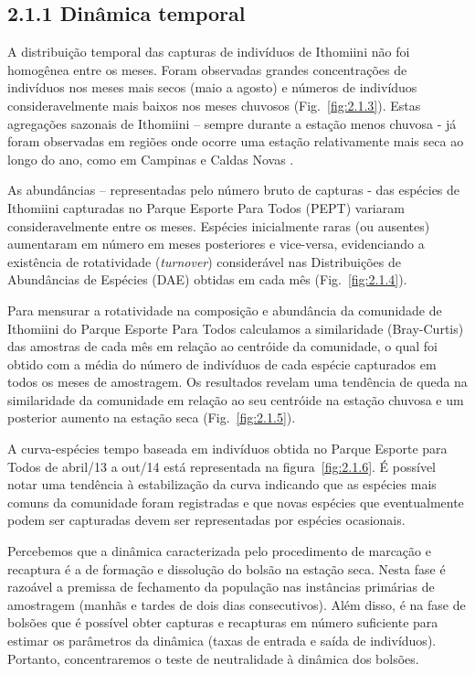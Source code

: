 \subsection{2.1.1 Dinâmica temporal} %
\label{sec:din-temp-borb}
A distribuição temporal das capturas de indivíduos de Ithomiini não
foi homogênea entre os meses. Foram observadas grandes concentrações
de indivíduos nos meses mais secos (maio a agosto) e números de
indivíduos consideravelmente mais baixos nos meses chuvosos
(Fig.~\ref{fig:2.1.3}). Estas agregações sazonais de Ithomiini –
sempre durante a estação menos chuvosa - já foram observadas em
regiões onde ocorre uma estação relativamente mais seca ao longo do
ano, como em Campinas \cite{brown2002} e Caldas Novas
\cite{Pinheiro_2008}.

As abundâncias – representadas pelo número bruto de capturas - das
espécies de Ithomiini capturadas no Parque Esporte Para Todos (PEPT)
variaram consideravelmente entre os meses. Espécies inicialmente raras
(ou ausentes) aumentaram em número em meses posteriores e vice-versa,
evidenciando a existência de rotatividade (\emph{turnover}) considerável nas
Distribuições de Abundâncias de Espécies (DAE) obtidas em cada mês
(Fig.~\ref{fig:2.1.4}).

Para mensurar a rotatividade na composição e
abundância da comunidade de Ithomiini do Parque Esporte Para Todos
calculamos a similaridade (Bray-Curtis) das amostras de cada mês em
relação ao centróide da comunidade, o qual foi obtido com a
média do número de indivíduos de cada espécie capturados em todos os
meses de amostragem. Os resultados revelam uma tendência de queda na
similaridade da comunidade em relação ao seu centróide na estação
chuvosa e um posterior aumento na estação seca (Fig.~\ref{fig:2.1.5}).

A curva-espécies tempo baseada em indivíduos obtida no Parque Esporte
para Todos de abril/13 a out/14 está representada na
figura~\ref{fig:2.1.6}. É possível notar uma tendência à estabilização
da curva indicando que as espécies mais comuns da comunidade foram
registradas e que novas espécies que eventualmente podem ser
capturadas devem ser representadas por espécies ocasionais.

Percebemos que a dinâmica caracterizada pelo procedimento de marcação e recaptura
é a de formação e dissolução do bolsão na estação seca.
Nesta fase é razoável a premissa de fechamento da população nas instâncias primárias
de amostragem (manhãs e tardes de dois dias consecutivos). Além disso, é na fase de bolsões
que é possível obter capturas e recapturas em número suficiente para estimar os parâmetros
da dinâmica (taxas de entrada e saída de indivíduos). Portanto, concentraremos 
o teste de neutralidade à dinâmica dos bolsões. 
